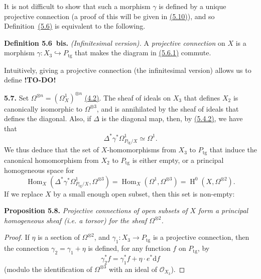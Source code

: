 \documentclass{report}
\newenvironment{itenv}[1]
  {\phantomsection\par\medskip\noindent\textbf{#1.}\itshape}
  {\par\medskip}
\newenvironment{rmenv}[1]
  {\phantomsection\par\medskip\noindent\textbf{#1.}\rmfamily}
  {\par\medskip}
\renewcommand{\cal}[1]{{\mathcal{#1}}}
\newcommand{\dd}{\mathrm{d}}
\newcommand{\tg}{\mathrm{tg}}
\DeclareMathOperator{\Hom}{Hom}
\DeclareMathOperator{\HH}{H}
\newcommand{\todo}{\textbf{ !TO-DO! }}
\newcommand{\oldpage}[1]{\marginpar{\footnotesize$\Big\vert$ \textit{p.~#1}}}
\begin{document}
It is not difficult to show that such a morphism $\gamma$ is defined by a unique projective connection (a proof of this will be given in \hyperref[I.5.10]{(5.10)}), and so Definition~\hyperref[I.5.6]{(5.6)} is equivalent to the following.

\begin{rmenv}{Definition 5.6~bis}
\label{I.5.6bis}
  \emph{(Infinitesimal version).}
  A \emph{projective connection} on $X$ is a morphism $\gamma\colon X_3\hookrightarrow P_\tg$ that makes the diagram in \hyperref[I.5.6.1]{(5.6.1)} commute.
\end{rmenv}

Intuitively, giving a projective connection (the infinitesimal version) allows us to define \todo

\begin{rmenv}{5.7}
\label{I.5.7}
  Set $\Omega^{\otimes n}=(\Omega_X^1)^{\otimes n}$ \hyperref[I.4.2]{(4.2)}.
  The sheaf of ideals on $X_3$ that defines $X_2$ is
\oldpage{32}
  canonically isomorphic to $\Omega^{\otimes3}$, and is annihilated by the sheaf of ideals that defines the diagonal.
  Also, if $\Delta$ is the diagonal map, then, by \hyperref[I.5.4.2]{(5.4.2)}, we have that
  \[
    \Delta^*\gamma^*\Omega_{P_\tg/X}^1 \simeq \Omega^1.
  \]
  We thus deduce that the set of $X$-homomorphisms from $X_3$ to $P_\tg$ that induce the canonical homomorphism from $X_2$ to $P_\tg$ is either empty, or a principal homogeneous space for
  \[
    \Hom_X(\Delta^*\gamma^*\Omega_{P_\tg/X}^1, \Omega^{\otimes3})
    = \Hom_X(\Omega^1,\Omega^{\otimes3})
    = \HH^0(X,\Omega^{\otimes2}).
  \]
  If we replace $X$ by a small enough open subset, then this set is non-empty:
\end{rmenv}

\begin{itenv}{Proposition 5.8}
\label{I.5.8}
  Projective connections of open subsets of $X$ form a principal homogeneous sheaf (i.e. a torsor) for the sheaf $\Omega^{\otimes2}$.
\end{itenv}

\begin{proof}
  If $\eta$ is a section of $\Omega^{\otimes2}$, and $\gamma_1\colon X_3\to P_\tg$ is a projective connection, then the connection $\gamma_2=\gamma_1+\eta$ is defined, for any function $f$ on $P_\tg$, by
  \[
  \label{I.5.8.1}
    \gamma_2^*f = \gamma_1^*f + \eta\cdot e^*\dd f
  \tag{5.8.1}
  \]
  (modulo the identification of $\Omega^{\otimes3}$ with an ideal of $\cal{O}_{X_3}$).
\end{proof}
\end{document}
